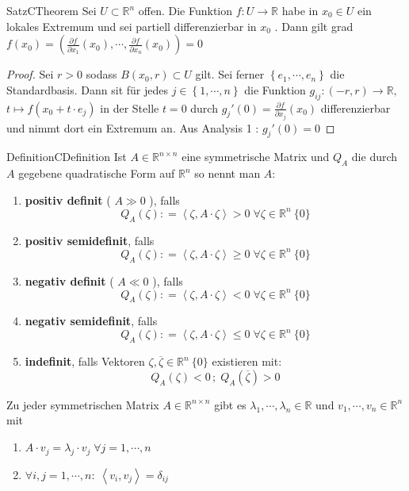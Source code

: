 \documentclass[11pt, a4paper]{memoir}
\begin{document}
\begin{ibox}[42]{Satz}{CTheorem}
    Sei $ U \subset \mathbb{R}^n  $ offen. Die Funktion $ f: U \to \mathbb{R}  $ habe in $ x_0 \in U$ ein lokales Extremum und sei 
	partiell differenzierbar in $ x_0 $ . Dann gilt grad $ f \left(x_0\right) = \left( \frac{\partial f}{\partial x_1} \left(x_0\right)
	, \cdots, \frac{\partial f}{\partial x_n} \left(x_0\right)  \right) = 0 $ 
\end{ibox}
\begin{proof}
	Sei $ r>0 $ sodass $ B \left( x_0, r \right) \subset U $ gilt. Sei ferner $ \left\{ e_1 , \cdots, e_n \right\}  $  die 
	Standardbasis. Dann sit für jedes $ j \in  \left\{ 1 , \cdots,  n \right\}  $ die Funktion $ g_{i j}: (-r, r) \to \mathbb{R} , \;$
	$ t \mapsto f \left( x_0 + t \cdot e_j \right)  $ in der Stelle $ t = 0 $ durch $ g_j' \left(0\right)  = 
	\frac{\partial f}{\partial x_j} \left(x_0\right)  $ differenzierbar und nimmt dort ein Extremum an. Aus Analysis 1 : $ g_{j}' 
	\left(0\right)  = 0$  
\end{proof}
\begin{ibox}[]{Definition}{CDefinition}
    Ist $ A \in \mathbb{R} ^{n \times n} $ eine symmetrische Matrix und $ Q_A $ die durch $ A $  gegebene quadratische Form auf 
	$ \mathbb{R}^n  $ so nennt man $ A $: 
	\begin{enumerate}[label=\alph*)]
		\item \textbf{positiv definit} ( $ A \gg 0 $ ), falls 
			$$ Q_{A} \left(\zeta\right) : = \left< \zeta, A \cdot \zeta \right> > 0 \; \forall \zeta \in \mathbb{R}^n \ \{0\} $$
			\item \textbf{positiv semidefinit},  falls 
			$$ Q_{A} \left(\zeta\right) : = \left< \zeta, A \cdot \zeta \right> \geq  0 \; \forall \zeta \in \mathbb{R}^n \ \{0\} $$
	\item \textbf{negativ definit} ( $ A \ll 0 $ ), falls 
			$$ Q_{A} \left(\zeta\right) : = \left< \zeta, A \cdot \zeta \right> < 0 \; \forall \zeta \in \mathbb{R}^n \ \{0\} $$
			\item \textbf{negativ semidefinit},  falls 
			$$ Q_{A} \left(\zeta\right) : = \left< \zeta, A \cdot \zeta \right> \leq  0 \; \forall \zeta \in \mathbb{R}^n \ \{0\} $$
		\item \textbf{indefinit}, falls Vektoren $ \zeta, \overline{ \zeta} \in \mathbb{R}^n \ \{0\} $ existieren mit: 
			$$ Q_{A} \left( \zeta \right) < 0 \, ; \; Q_{A} \left( \overline{ \zeta}  \right) > 0 $$
			
	\end{enumerate}
Zu jeder symmetrischen Matrix $ A \in \mathbb{R}^{n \times n} $ gibt es $ \lambda_1 , \cdots,  \lambda_n \in \mathbb{R}  $ und 
$ v_1 , \cdots,  v_n \in \mathbb{R}^n  $ mit 
\begin{enumerate}[label=\alph*)]
	\item $ A \cdot v_j = \lambda_j \cdot v_j \; \forall j = 1 , \cdots,  n $ 
	\item $ \forall  i,j = 1 , \cdots,  n: \; \left<v_i, v_j \right> = \delta_{i j} $ 
\end{enumerate}
\end{ibox}
\end{document}
